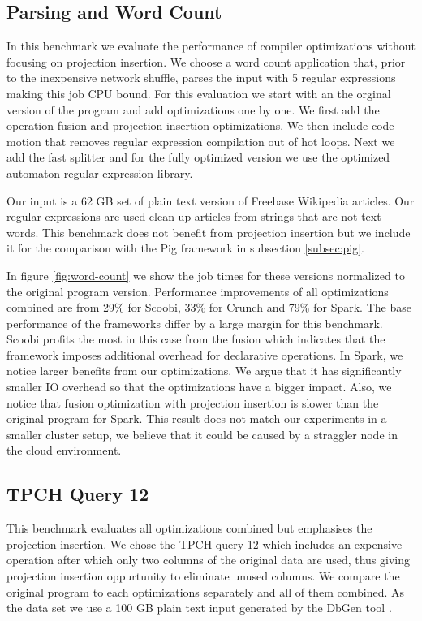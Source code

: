 \subsection{Parsing and Word Count}
\label{subsec:parsing-word-count}

In this benchmark we evaluate the performance of \tool compiler optimizations without focusing on projection insertion. We choose a word count application that, prior to the inexpensive network shuffle, parses the input with 5 regular expressions making this job CPU bound. For this evaluation we start with an the orginal version of the program and add optimizations one by one. We first add the operation fusion and projection insertion optimizations. We then include code motion that removes regular expression compilation out of hot loops. Next we add the fast splitter and for the fully optimized version we use the optimized automaton regular expression library.    

Our input is a 62 GB set of plain text version of Freebase Wikipedia articles. Our regular expressions are used clean up articles from strings that are not text words. This benchmark does not benefit from projection insertion but we include it for the comparison with the Pig framework in subsection \ref{subsec:pig}.

In figure \ref{fig:word-count} we show the job times for these versions normalized to the original program version. Performance improvements of all optimizations combined are from 29\% for Scoobi, 33\% for Crunch and 79\% for Spark. The base performance of the frameworks differ by a large margin for this benchmark. Scoobi profits the most in this case from the fusion which indicates that the framework imposes additional overhead for declarative operations. In Spark, we notice larger benefits from our optimizations. We argue that it has significantly smaller IO overhead so that the optimizations have a bigger impact. Also, we notice that fusion optimization with projection insertion is slower than the original program for Spark. This result does not match our experiments in a smaller cluster setup, we believe that it could be caused by a straggler node in the cloud environment.

\subsection{TPCH Query 12}
\label{subsec:tpch-query-12}

This benchmark evaluates all optimizations combined but emphasises the projection insertion. We chose the TPCH query 12 which includes an expensive  operation after which only two columns of the original data are used, thus giving projection insertion oppurtunity to eliminate unused columns. We compare the original program to each optimizations separately and all of them combined. As the data set we use a 100 GB plain text input generated by the DbGen tool \cite{tpch}.

